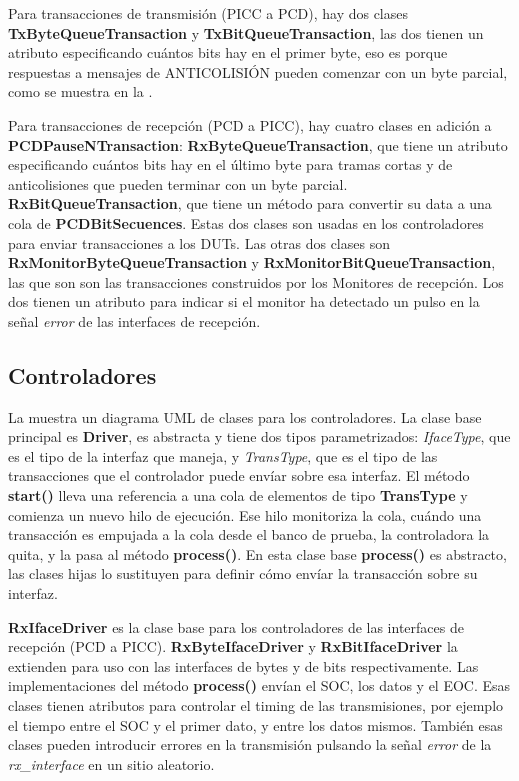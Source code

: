 \documentclass[a4paper, twoside, 11pt]{report}
\begin{document}
Para transacciones de transmisión (PICC a PCD), hay dos clases \textbf{TxByteQueueTransaction} y \textbf{TxBitQueueTransaction}, las dos tienen un atributo especificando cuántos bits hay en el primer byte, eso es porque respuestas a mensajes de ANTICOLISIÓN pueden comenzar con un byte parcial, como se muestra en la .

Para transacciones de recepción (PCD a PICC), hay cuatro clases en adición a \textbf{PCDPauseNTransaction}: \textbf{RxByteQueueTransaction}, que tiene un atributo especificando cuántos bits hay en el último byte para tramas cortas y de anticolisiones que pueden terminar con un byte parcial. \textbf{RxBitQueueTransaction}, que tiene un método para convertir su data a una cola de \textbf{PCDBitSecuences}. Estas dos clases son usadas en los controladores para enviar transacciones a los DUTs. Las otras dos clases son \textbf{RxMonitorByteQueueTransaction} y \textbf{RxMonitorBitQueueTransaction}, las que son son las transacciones construidos por los Monitores de recepción. Los dos tienen un atributo para indicar si el monitor ha detectado un pulso en la señal \textit{error} de las interfaces de recepción.

\FloatBarrier
\subsection{Controladores}

La  muestra un diagrama UML de clases para los controladores. La clase base principal es \textbf{Driver}, es abstracta y tiene dos tipos parametrizados: \textit{IfaceType}, que es el tipo de la interfaz que maneja, y \textit{TransType}, que es el tipo de las transacciones que el controlador puede envíar sobre esa interfaz. El método \textbf{start()} lleva una referencia a una cola de elementos de tipo \textbf{TransType} y comienza un nuevo hilo de ejecución. Ese hilo monitoriza la cola, cuándo una transacción es empujada a la cola desde el banco de prueba, la controladora la quita, y la pasa al método \textbf{process()}. En esta clase base \textbf{process()} es abstracto, las clases hijas lo sustituyen para definir cómo envíar la transacción sobre su interfaz.

\textbf{RxIfaceDriver} es la clase base para los controladores de las interfaces de recepción (PCD a PICC). \textbf{RxByteIfaceDriver} y \textbf{RxBitIfaceDriver} la extienden para uso con las interfaces de bytes y de bits respectivamente. Las implementaciones del método \textbf{process()} envían el SOC, los datos y el EOC. Esas clases tienen atributos para controlar el timing de las transmisiones, por ejemplo el tiempo entre el SOC y el primer dato, y entre los datos mismos. También esas clases pueden introducir errores en la transmisión pulsando la señal \textit{error} de la \textit{rx\_interface} en un sitio aleatorio.
\end{document}
